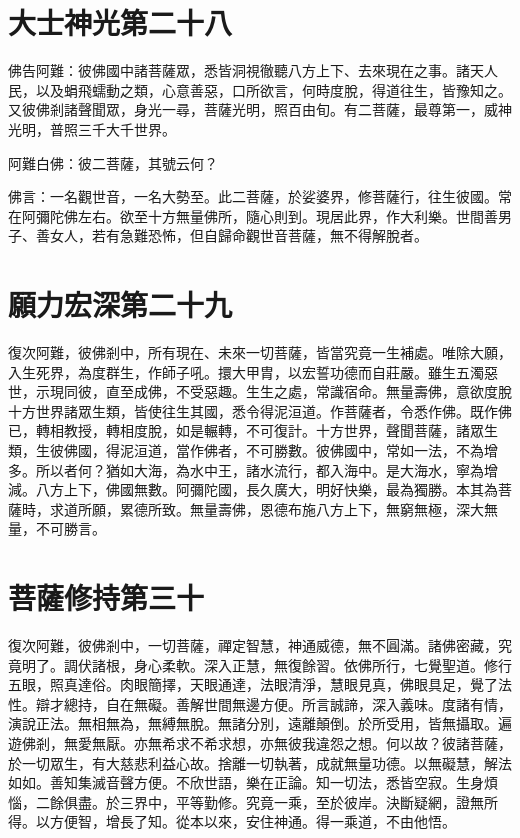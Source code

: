\documentclass{zhvt-classic}
\begin{document}
\chapter*{大士神光第二十八}

佛告阿難：彼佛國中諸菩薩眾，悉皆洞視徹聽八方上下、去來現在之事。諸天人民，以及蜎飛蠕動之類，心意善惡，口所欲言，何時度脫，得道往生，皆豫知之。又彼佛剎諸聲聞眾，身光一尋，菩薩光明，照百由旬。有二菩薩，最尊第一，威神光明，普照三千大千世界。

阿難白佛：彼二菩薩，其號云何？

佛言：一名觀世音，一名大勢至。此二菩薩，於娑婆界，修菩薩行，往生彼國。常在阿彌陀佛左右。欲至十方無量佛所，隨心則到。現居此界，作大利樂。世間善男子、善女人，若有急難恐怖，但自歸命觀世音菩薩，無不得解脫者。

\chapter*{願力宏深第二十九}

復次阿難，彼佛剎中，所有現在、未來一切菩薩，皆當究竟一生補處。唯除大願，入生死界，為度群生，作師子吼。擐大甲胄，以宏誓功德而自莊嚴。雖生五濁惡世，示現同彼，直至成佛，不受惡趣。生生之處，常識宿命。無量壽佛，意欲度脫十方世界諸眾生類，皆使往生其國，悉令得泥洹道。作菩薩者，令悉作佛。既作佛已，轉相教授，轉相度脫，如是輾轉，不可復計。十方世界，聲聞菩薩，諸眾生類，生彼佛國，得泥洹道，當作佛者，不可勝數。彼佛國中，常如一法，不為增多。所以者何？猶如大海，為水中王，諸水流行，都入海中。是大海水，寧為增減。八方上下，佛國無數。阿彌陀國，長久廣大，明好快樂，最為獨勝。本其為菩薩時，求道所願，累德所致。無量壽佛，恩德布施八方上下，無窮無極，深大無量，不可勝言。

\chapter*{菩薩修持第三十}

復次阿難，彼佛剎中，一切菩薩，禪定智慧，神通威德，無不圓滿。諸佛密藏，究竟明了。調伏諸根，身心柔軟。深入正慧，無復餘習。依佛所行，七覺聖道。修行五眼，照真達俗。肉眼簡擇，天眼通達，法眼清淨，慧眼見真，佛眼具足，覺了法性。辯才總持，自在無礙。善解世間無邊方便。所言誠諦，深入義味。度諸有情，演說正法。無相無為，無縛無脫。無諸分別，遠離顛倒。於所受用，皆無攝取。遍遊佛剎，無愛無厭。亦無希求不希求想，亦無彼我違怨之想。何以故？彼諸菩薩，於一切眾生，有大慈悲利益心故。捨離一切執著，成就無量功德。以無礙慧，解法如如。善知集滅音聲方便。不欣世語，樂在正論。知一切法，悉皆空寂。生身煩惱，二餘俱盡。於三界中，平等勤修。究竟一乘，至於彼岸。決斷疑網，證無所得。以方便智，增長了知。從本以來，安住神通。得一乘道，不由他悟。
\end{document}
